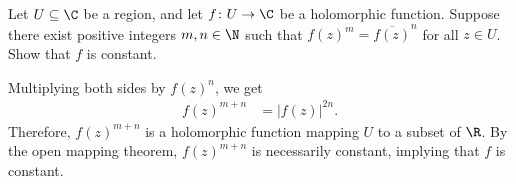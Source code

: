 \documentclass[10pt]{mypackage}
\begin{document}
\begin{problem}[Problem 5]
  Let $U\subseteq \C$ be a region, and let $f\colon U\rightarrow \C$ be a holomorphic function. Suppose there exist positive integers $m,n\in \N$ such that $f(z)^{m} = \overline{f\left( z \right)}^{n}$ for all $z\in U$. Show that $f$ is constant.
\end{problem}
\begin{solution}
  Multiplying both sides by $f(z)^{n}$, we get
  \begin{align*}
    f(z)^{m + n} &= \left\vert f(z) \right\vert^{2n}.
  \end{align*}
  Therefore, $f(z)^{m+n}$ is a holomorphic function mapping $U$ to a subset of $\R$. By the open mapping theorem, $f(z)^{m+n}$ is necessarily constant, implying that $f$ is constant.
\end{solution}
\end{document}
